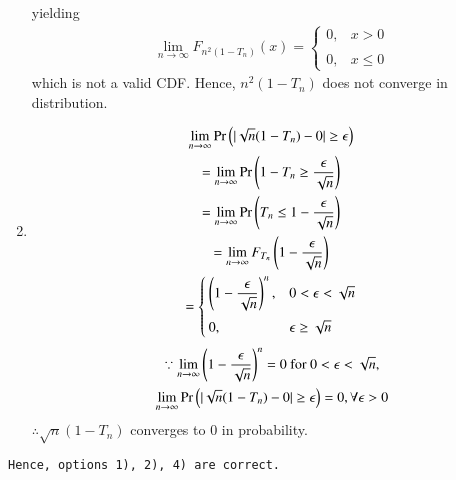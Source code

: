 \begin{enumerate}
	yielding 
	\begin{align}
\label{conv/1/eq:cdf2}
    \displaystyle\lim_{n\to\infty} F_{n^{2}(1-T_{n})}(x)=\begin{cases}
	0, & x>0 \\~\\[-1em]
	0, & x\leq 0
	\end{cases} 
\end{align}
which is not a valid CDF.  Hence, 
$ n^{2}(1-T_{n})$ does not converge in distribution.
\item 
\begin{multline}
	\displaystyle\lim_{n\to\infty}\Pr\left(|\sqrt{n}(1-T_{n})-0|\geq\epsilon\right)    \\ =\displaystyle\lim_{n\to\infty}\Pr\left(1-T_{n}\geq\dfrac{\epsilon}{\sqrt{n}}\right)\\
    =\displaystyle\lim_{n\to\infty}\Pr\left(T_{n}\leq1-\dfrac{\epsilon}{\sqrt{n}}\right)\\
	=\displaystyle\lim_{n\to\infty}F_{T_{n}}\left( 1-\dfrac{\epsilon}{\sqrt{n}}\right)
	\\
	=\begin{cases}
		\left(1-\dfrac{\epsilon}{\sqrt{n}}\right)^{n}, & 0< \epsilon< \sqrt{n}\\~\\[-1em]
		0, & \epsilon\geq \sqrt{n}
		\end{cases}
\end{multline}
\begin{multline}
    \because\displaystyle\lim_{n\to\infty}\left(1-\dfrac{\epsilon}{\sqrt{n}}\right)^{n}=0 \text{ for } 0< \epsilon<\sqrt{n},\\
     \displaystyle\lim_{n\to\infty}\Pr\left(|\sqrt{n}(1-T_{n})-0|\geq\epsilon\right)=0,\forall\epsilon>0
\end{multline}
$\therefore\sqrt{n}(1-T_{n})$ converges to 0 in probability.
\end{enumerate}
\begin{lstlisting}
Hence, options 1), 2), 4) are correct.
\end{lstlisting}